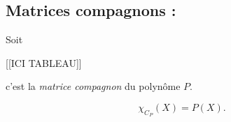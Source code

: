 \documentclass[class=report,crop=false]{standalone}
\begin{document}
\subsection*{ Matrices compagnons :}

Soit 

[[ICI TABLEAU]]


c'est la {\it matrice compagnon}  du polynôme $P$.
\begin{proposition}
\[\chi_{C_P}(X) = P(X) .\]
\end{proposition}
\end{document}
